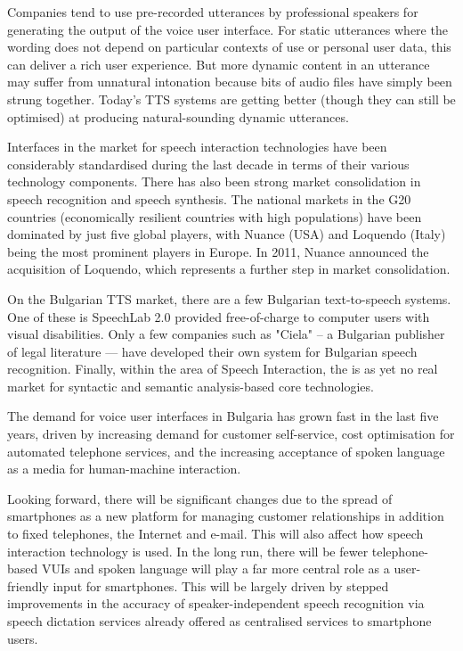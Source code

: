 \begin{multicols}{2}
Companies tend to use pre-recorded utterances by professional speakers for generating the output of the voice user interface. For static utterances where the wording does not depend on particular contexts of use or personal user data, this can deliver a rich user experience. But more dynamic content in an utterance may suffer from unnatural intonation because bits of audio files have simply been strung together. Today’s TTS systems are getting better (though they can still be optimised) at producing natural-sounding dynamic utterances.  

Interfaces in the market for speech interaction technologies have been considerably standardised during the last decade in terms of their various technology components. There has also been strong market consolidation in speech recognition and speech synthesis. The national markets in the G20 countries (economically resilient countries with high populations) have been dominated by just five global players, with Nuance (USA) and Loquendo (Italy) being the most prominent players in Europe. In 2011, Nuance announced the acquisition of Loquendo, which represents a further step in market consolidation.

On the Bulgarian TTS market, there are a few Bulgarian text-to-speech systems. One of these is SpeechLab 2.0 provided free-of-charge to computer users with visual disabilities. Only a few companies such as "Ciela" – a Bulgarian publisher of legal literature — have developed their own system for Bulgarian speech recognition. Finally, within the area of Speech Interaction, the is as yet no real market for syntactic and semantic analysis-based core technologies. 

The demand for voice user interfaces in Bulgaria has grown fast in the last five years, driven by increasing demand for customer self-service, cost optimisation for automated telephone services, and the increasing acceptance of spoken language as a media for human-machine interaction. 

Looking forward, there will be significant changes due to the spread of smartphones as a new platform for managing customer relationships in addition to fixed telephones, the Internet and e-mail. This will also affect how speech interaction technology is used. In the long run, there will be fewer telephone-based VUIs and spoken language will play a far more central role as a user-friendly input for smartphones. This will be largely driven by stepped improvements in the accuracy of speaker-independent speech recognition via speech dictation services already offered as centralised services to smartphone users. 




\end{multicols}
